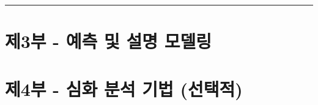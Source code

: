 \documentclass[
  letterpaper,
]{book}
\begin{document}
\begin{center}\rule{0.5\linewidth}{0.5pt}\end{center}

\chapter{}\label{section}

\chapter{}\label{section-1}

\part{제3부 - 예측 및 설명 모델링}

\chapter{}\label{section-2}

\chapter{}\label{section-3}

\chapter{}\label{section-4}

\chapter{}\label{section-5}

\chapter{}\label{section-6}

\part{제4부 - 심화 분석 기법 (선택적)}

\chapter{}\label{section-7}

\chapter{}\label{section-8}
\end{document}
